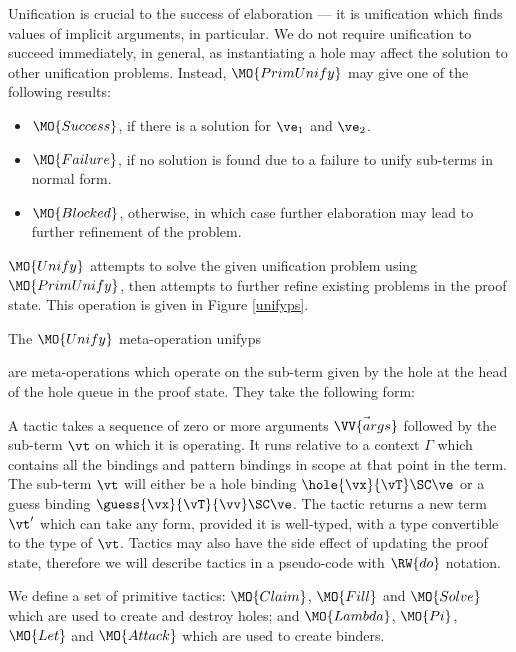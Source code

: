 Unification is crucial to the success of elaboration --- it is unification
which finds values of implicit arguments, in particular. We do not require
unification to succeed immediately, in general, as instantiating a hole may 
affect the solution to other unification problems. Instead, 
$\MO{PrimUnify}$ may give one of the following results:

\begin{itemize}
\item $\MO{Success}$, if there is a solution for $\ve_1$ and $\ve_2$. 
\item $\MO{Failure}$, if no solution is found due to a failure to unify
sub-terms in normal form.
\item $\MO{Blocked}$, otherwise, in which case further elaboration may lead
to further refinement of the problem.
\end{itemize}

$\MO{Unify}$ attempts to solve the given unification problem using
$\MO{PrimUnify}$, then attempts to further refine existing problems in the proof
state. This operation is given in Figure \ref{unifyps}. 

{The $\MO{Unify}$ meta-operation}
{unifyps}

 are meta-operations which operate on the sub-term given
by the hole at the head of the hole queue in the proof state. They take the following form:


A tactic takes a sequence of zero or more arguments $\vec{\VV{args}}$ followed
by the sub-term $\vt$ on which it is operating. It runs relative to a context
$\Gamma$ which contains all the bindings and pattern bindings in scope at that
point in the term. The sub-term $\vt$ will either be a hole binding
$\hole{\vx}{\vT}\SC\ve$ or a guess binding $\guess{\vx}{\vT}{\vv}\SC\ve$. The
tactic returns a new term $\vt'$ which can take any form, provided it is
well-typed, with a type convertible to the type of $\vt$. 
Tactics may also have the side effect of updating the proof state,
therefore we will describe tactics in a pseudo-code with $\RW{do}$ notation.

We define a set of primitive tactics: $\MO{Claim}$, $\MO{Fill}$ and $\MO{Solve}$
which are used to create and destroy holes; and $\MO{Lambda}$, $\MO{Pi}$, $\MO{Let}$
and $\MO{Attack}$ which are used to create binders.

